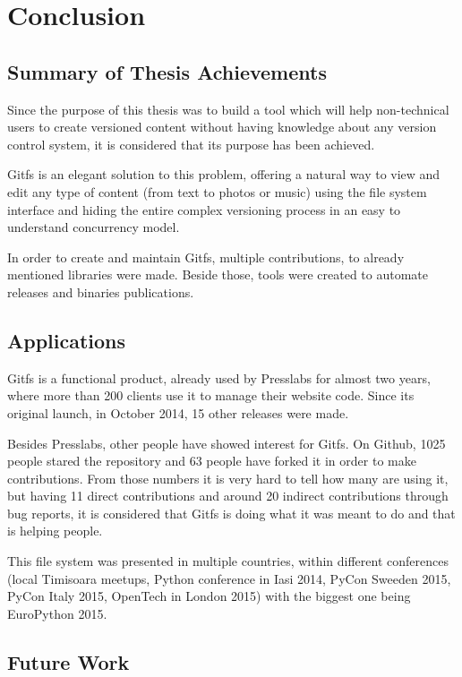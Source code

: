 
\chapter{Conclusion}

\label{ch:conclusions}

\section{Summary of Thesis Achievements}

Since the purpose of this thesis was to build a tool which will help non-technical users to create versioned content without having knowledge about any version control system, it is considered that its purpose has been achieved.

Gitfs is an elegant solution to this problem, offering a natural way to view and edit any type of content (from text to photos or music) using the file system interface and hiding the entire complex versioning process in an easy to understand concurrency model.

In order to create and maintain Gitfs, multiple contributions, to already mentioned libraries were made. Beside those, tools were created to automate releases and binaries publications.

\section{Applications}

Gitfs is a functional product, already used by Presslabs for almost two years, where more than 200 clients use it to manage their website code. Since its original launch, in October 2014, 15 other releases were made.

Besides Presslabs, other people have showed interest for Gitfs. On Github, 1025 people stared the repository and 63 people have forked it in order to make contributions. From those numbers it is very hard to tell how many are using it, but having 11 direct contributions and around 20 indirect contributions through bug reports, it is considered that Gitfs is doing what it was meant to do and that is helping people.

This file system was presented in multiple countries, within different conferences (local Timisoara meetups, Python conference in Iasi 2014, PyCon Sweeden 2015, PyCon Italy 2015, OpenTech in London 2015) with the biggest one being EuroPython 2015.

\section{Future Work}

